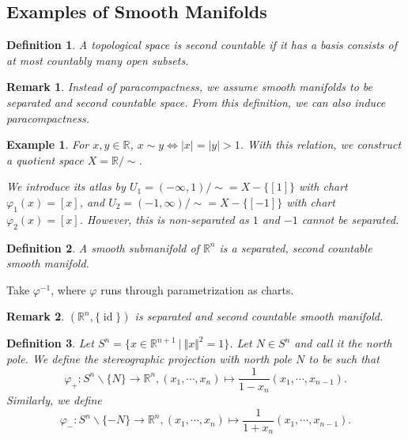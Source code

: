 \documentclass[8pt]{article}
\newtheorem{definition}{Definition}[section]
\newtheorem{remark}{Remark}[section]
\newtheorem{example}{Example}[section]
\DeclareMathOperator{\id}{id}
\newcommand{\norm}[1]{\Vert #1 \Vert}
\newcommand{\R}[0]{\mathbb{R}}
\newcommand{\sep}[0]{\:|\:}
\begin{document}
\subsection{Examples of Smooth Manifolds}

\begin{definition}
  A topological space is second countable if it has a basis consists of at most countably many open subsets.
\end{definition}

\begin{remark}
  Instead of paracompactness, we assume smooth manifolds to be separated and second countable space. From this definition, we can also induce paracompactness.
\end{remark}

\begin{example}
For $x,y\in\R$, $x\sim y \Leftrightarrow \vert x\vert = \vert y \vert > 1$. With this relation, we construct a quotient space $X = \R/\sim$. 
\par We introduce its atlas by $U_1 = (-\infty,1)/\sim=X-\{[1]\}$ with chart $\varphi_1(x) = [x]$, and $U_2 = (-1,\infty)/\sim=X-\{[-1]\}$ with chart $\varphi_2(x) = [x]$. However, this is non-separated as $1$ and $-1$ cannot be separated.
\end{example}

\begin{definition}
  A smooth submanifold of $\R^n$ is a separated, second countable smooth manifold. 
\end{definition}

Take $\varphi^{-1}$, where $\varphi$ runs through parametrization as charts.

\begin{remark}
$(\R^n,\{\id\})$ is separated and second countable smooth manifold.
\end{remark}

\begin{definition}
  Let $S^n = \{x\in\R^{n+1}\sep\norm{x}^2 = 1\}$. Let $N\in S^n$ and call it the north pole. We define the stereographic projection with north pole $N$ to be such that
  \begin{equation*}
    \varphi_+:S^n\backslash\{N\}\to\R^n,(x_1,\cdots,x_{n})\mapsto {\frac 1 {1-x_n}}(x_1,\cdots,x_{n-1}).
  \end{equation*}
  Similarly, we define 
  \begin{equation*}
    \varphi_-:S^n\backslash\{-N\}\to\R^n,(x_1,\cdots,x_{n})\mapsto {\frac 1 {1+x_n}}(x_1,\cdots,x_{n-1}).
  \end{equation*}
\end{definition}
\end{document}
